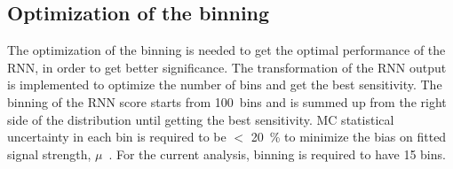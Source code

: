 \subsection{Optimization of the binning}
The optimization of the binning is needed to get the optimal performance of the RNN, in order to get better significance. 
The transformation of the RNN output \cite{ATL-PHYS-PUB-2019-009} is implemented to optimize the number of bins and get the best sensitivity.
The binning of the RNN score starts from 100~bins and is summed up from the right side of the distribution until getting the best sensitivity. 
MC statistical uncertainty in each bin is required to be $<$ 20~\% to minimize the bias on fitted signal strength, $\mu$~\cite{ATL-PHYS-PUB-2019-009}. 
For the current analysis, binning is required to have 15 bins.